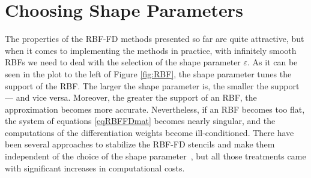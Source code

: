 \documentclass{UUThesisTemplate}
\begin{document}
%
\section{Choosing Shape Parameters}
The properties of the RBF-FD methods presented so far are quite attractive, but when it comes to implementing the methods in practice, with infinitely smooth RBFs we need to deal with the selection of the shape parameter $\varepsilon$. As it can be seen in the plot to the left of Figure \ref{fig:RBF}, the shape parameter tunes the support of the RBF. The larger the shape parameter is, the smaller the support --- and vice versa. Moreover, the greater the support of an RBF, the approximation becomes more accurate. Nevertheless, if an RBF becomes too flat, the system of equations \eqref{eqRBFFDmat} becomes nearly singular, and the computations of the differentiation weights become ill-conditioned. There have been several approaches to stabilize the RBF-FD stencils and make them independent of the choice of the shape parameter~\cite{fornberg2013stable}, but all those treatments came with significant increases in computational costs.  
\end{document}
